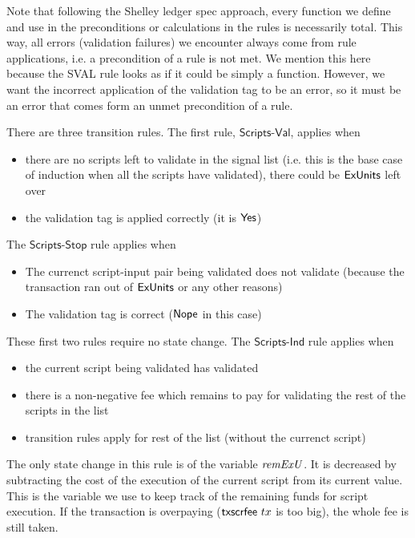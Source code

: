 Note that following the Shelley ledger spec approach, every function
we define and use in the preconditions or calculations in the rules is
necessarily total.
This way, all errors (validation failures) we encounter always come from
rule applications, i.e. a precondition of a rule is not met.
We mention this here because the SVAL rule looks as if it could be
simply a function. However, we want the incorrect application of the
validation tag to be an error, so it must be an error that comes form
an unmet precondition of a rule.

There are three transition rules.
The first rule, $\mathsf{Scripts\mbox{-}Val}$, applies when

\begin{itemize}
\item there
are no scripts left to validate in the signal list (i.e. this is the base case of
induction when all the scripts have validated), there could be $\mathsf{ExUnits}$ left over
\item the validation tag is applied correctly (it is $\mathsf{Yes}$)
\end{itemize}

The $\mathsf{Scripts\mbox{-}Stop}$ rule applies when

\begin{itemize}
  \item The currenct script-input pair being validated does not validate
  (because the transaction ran out of $\mathsf{ExUnits}$ or any other reasons)
  \item The validation tag is correct ($\mathsf{Nope}$ in this case)
\end{itemize}

These first two rules require no state change.
The $\mathsf{Scripts\mbox{-}Ind}$ rule applies when

\begin{itemize}
  \item the current script being validated has validated
  \item there is a non-negative fee which remains to pay for validating
  the rest of the scripts in the list
  \item transition rules apply for rest of the list (without the currenct script)
\end{itemize}

The only state change in this rule is of the variable $\mathit{remExU}$.
It is decreased by subtracting the cost of the execution of the
current script from its current value.
This is the variable we use to keep track of the remaining funds for
script execution. If the transaction is overpaying ($\mathsf{txscrfee}~{tx}$
is too big), the whole fee is still taken.

